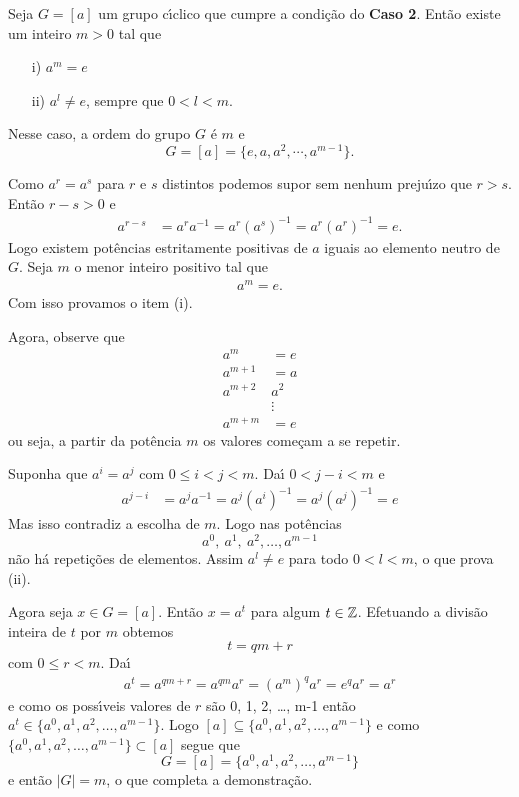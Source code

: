 \begin{proposicao}
    Seja $G = [a]$ um grupo c{\'\i}clico que cumpre a condi\c{c}\~ao do \textbf{Caso 2}. Ent\~ao existe um inteiro $m > 0$ tal que
    \begin{enumerate}
        \item[i)] $a^m = e$

        \item[ii)] $a^l \ne e$, sempre que $0 < l < m$.
    \end{enumerate}
    Nesse caso, a ordem do grupo $G$ \'e $m$ e
    \[
        G = [a] = \{e, a, a^2, \cdots, a^{m - 1}\}.
    \]
\end{proposicao}
\begin{prova}
	Como $a^r = a^s$ para $r$ e $s$ distintos podemos supor sem nenhum preju{\'\i}zo que $r > s$. Ent\~ao $r - s > 0$ e
	\begin{align*}
		a^{r - s} &= a^ra^{-1} = a^r(a^s)^{-1} = a^r(a^r)^{-1} = e.
	\end{align*}
	Logo existem pot\^encias estritamente positivas de $a$ iguais ao elemento neutro de $G$. Seja $m$ o menor inteiro positivo tal que
	\begin{align}\label{ordem_elemento_ciclico}
		a^m = e.
	\end{align}
	Com isso provamos o item (i).

	Agora, observe que
	\begin{align*}
		a^m &= e\\
		a^{m + 1} &= a\\
		a^{m + 2} & a^2\\
		&\vdots\\
		a^{m + m} &= e
	\end{align*}
	ou seja, a partir da pot\^encia $m$ os valores come\c{c}am a se repetir.

	Suponha que $a^i = a^j$ com $0 \le i < j < m$. Da{\'\i} $0 < j - i < m$ e
	\begin{align*}
		a^{j -  i} &= a^ja^{-1} = a^j(a^i)^{-1} = a^j(a^j)^{-1} = e
	\end{align*}
	Mas isso contradiz a escolha de $m$. Logo nas pot\^encias
	\[
		a^0,\ a^1,\ a^2, \dots, a^{m - 1}
	\]
	n\~ao h\'a repeti\c{c}\~oes de elementos. Assim $a^l \ne e$ para todo $0 < l < m$, o que prova (ii).

	Agora seja $x \in G = [a]$. Ent\~ao $x = a^t$ para algum $t \in \mathbb{Z}$. Efetuando a divis\~ao inteira de $t$ por $m$ obtemos
	\[
		t = qm + r
	\]
	com $0 \le r < m$. Da{\'\i}
	\begin{align*}
		a^t = a^{qm + r} = a^{qm}a^r = (a^m)^qa^r = e^qa^r = a^r
	\end{align*}
	e como os poss{\'\i}veis valores de $r$ s\~ao 0, 1, 2, \dots, m-1 ent\~ao $a^t \in \{a^0, a^1, a^2, \dots, a^{m - 1}\}$. Logo $[a] \subseteq \{a^0, a^1, a^2, \dots, a^{m - 1}\}$ e como $\{a^0, a^1, a^2, \dots, a^{m - 1}\} \subset [a]$ segue que
	\[
		G = [a] = \{a^0, a^1, a^2, \dots, a^{m - 1}\}
	\]
	e ent\~ao $|G| = m$, o que completa a demonstra\c{c}\~ao.
\end{prova}

